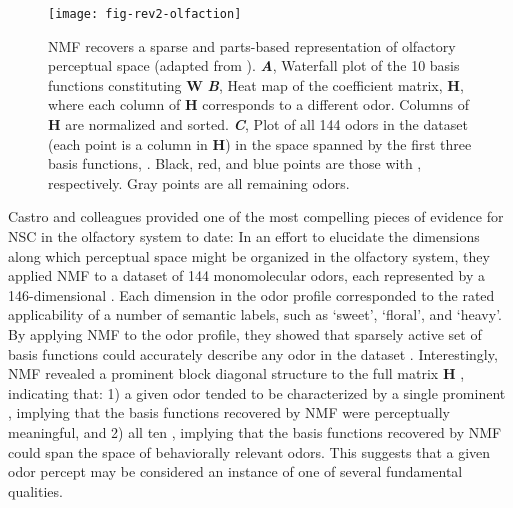 \begin{figure}[b!]
	\centering
	\texttt{[image: fig-rev2-olfaction]}
    \caption{\ac{NMF} recovers a sparse and parts-based representation
    of olfactory perceptual space (adapted  
    from \cite{Castro2013}).
       \textbf{\emph{A}},
          Waterfall plot of the 10 basis functions constituting \textbf{W}
       \textbf{\emph{B}},
          Heat map of the  coefficient matrix, \textbf{H},
          where each column of \textbf{H} corresponds to a different odor.
          Columns of \textbf{H} are normalized and sorted.
       \textbf{\emph{C}},
          Plot of all 144 odors in the dataset (each point is a column in \textbf{H})
          in the space spanned by the first three basis functions,
          .
          Black, red, and blue points are those with 
          , respectively. 
          Gray points are all remaining odors.}
	\label{fig:evidence-olfaction}
\end{figure}

Castro and colleagues \cite{Castro2013} provided 
one of the most compelling pieces of evidence for \ac{NSC}
in the olfactory system to date:
In an effort to elucidate the dimensions along which perceptual space might be
organized in the olfactory system,
they applied \ac{NMF} to a dataset of 144 monomolecular odors,
each represented by a 146-dimensional .
Each dimension in the odor profile corresponded to the rated applicability of
a number of semantic labels, such as `sweet', `floral', and `heavy'.
By applying \ac{NMF} to the odor profile, they showed that 
 sparsely active set of basis functions 
could accurately describe any odor in the dataset
.
Interestingly, \ac{NMF} revealed a prominent block
diagonal structure to the full matrix \textbf{H}
, indicating that:
1) a given odor tended to be characterized by a single prominent ,
implying that the basis functions recovered by \ac{NMF} were perceptually meaningful,
and 2) all ten ,
implying that the basis functions recovered by \ac{NMF} could span the space of
behaviorally relevant odors.
This suggests that a given odor percept may be considered an 
instance of one of several fundamental qualities.

